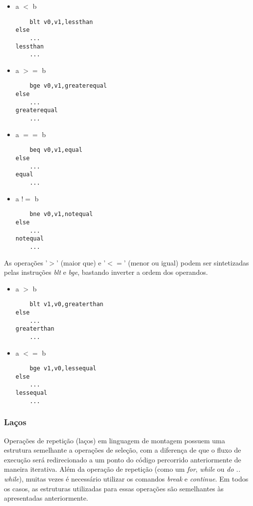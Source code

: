 \documentclass[11pt,a4paper]{report}
\begin{document}
\begin{multicols}{2}
\begin{itemize}
\item a $<$ b
\begin{verbatim}
    blt v0,v1,lessthan
else
    ...
lessthan
    ...
\end{verbatim}

\item a $>=$ b
\begin{verbatim}
    bge v0,v1,greaterequal
else
    ...
greaterequal
    ...
\end{verbatim}

\item a $==$ b
\begin{verbatim}
    beq v0,v1,equal
else
    ...
equal
    ...
\end{verbatim}

\item a $!=$ b
\begin{verbatim}
    bne v0,v1,notequal
else
    ...
notequal
    ...
\end{verbatim}
\end{itemize}
\end{multicols}

As operações '$>$' (maior que) e '$<=$' (menor ou igual) podem ser
sintetizadas pelas instruções \textit{blt} e \textit{bge}, bastando
inverter a ordem dos operandos.

\begin{multicols}{2}
\begin{itemize}
\item a $>$ b
\begin{verbatim}
    blt v1,v0,greaterthan
else
    ...
greaterthan
    ...
\end{verbatim}

\item a $<=$ b
\begin{verbatim}
    bge v1,v0,lessequal
else
    ...
lessequal
    ...
\end{verbatim}
\end{itemize}
\end{multicols}

\subsubsection{Laços}

Operações de repetição (laços) em linguagem de montagem possuem uma
estrutura semelhante a operações de seleção, com a diferença de que
o fluxo de execução será redirecionado a um ponto do código percorrido
anteriormente de maneira iterativa. Além da operação de repetição
(como um \textit{for}, \textit{while} ou \textit{do .. while}), muitas
vezes é necessário utilizar os comandos \textit{break} e \textit{continue}.
Em todos os casos, as estruturas utilizadas para essas operações são
semelhantes às apresentadas anteriormente.
\end{document}

